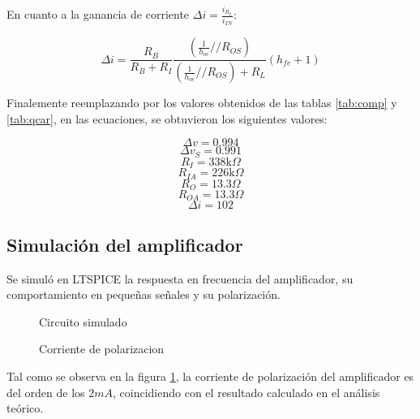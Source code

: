 \documentclass[../../main.tex]{subfiles}
\begin{document}
En cuanto a la ganancia de corriente $\Delta i=\frac{i_{R_L}}{i_{IN}}$:

\begin{equation}
\Delta i=\frac{R_B}{R_B +R_I} \frac{\left(  \frac{1}{h_{oe}} // R_{OS} \right)}{\left(  \frac{1}{h_{oe}} // R_{OS} \right) + R_L} (h_{fe} +1)
\end{equation}

Finalemente reemplazando por los valores obtenidos de las tablas \ref{tab:comp} y \ref{tab:qcar}, en las ecuaciones, se obtuvieron los siguientes valores:

$$\Delta v = 0.994$$
$$ \Delta v_S =0.991 $$
$$ R_I=338\mathrm{k}\Omega $$
$$ R_{IA} = 226\mathrm{k}\Omega $$
$$ R_O=13.3 \Omega $$
$$R_{OA}=13.3\Omega $$
$$\Delta i= 102 $$

\subsection{Simulación del amplificador}
Se simul\'o en LTSPICE la respuesta en frecuencia del amplificador, su comportamiento en pequeñas señales y su polarización.

\begin{figure}[H]	
	\centering
	\caption{Circuito simulado}
\end{figure}

\begin{figure}[H]	
	\centering
	\caption{Corriente de polarizacion}\label{fig:simicq}
\end{figure}
Tal como se observa en la figura \ref{fig:simicq}, la corriente de polarización del amplificador es del orden de los $2mA$, coincidiendo con el resultado calculado en el análisis teórico.
\end{document}
